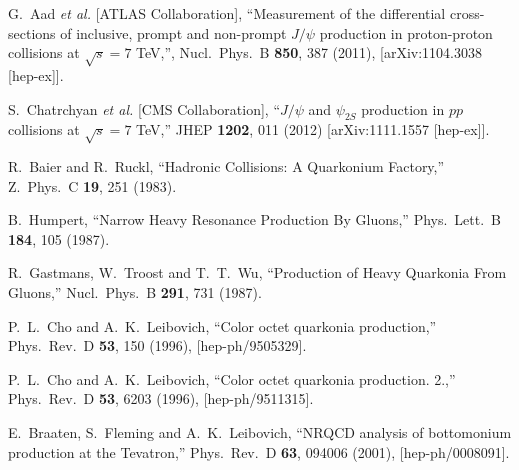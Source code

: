 \documentclass[aps,prc,preprint,superscriptaddress,showpacs,showkeys,amsmath]{revtex4-1}
\begin{document}
\begin{thebibliography}{100}
  G.~Aad {\it et al.} [ATLAS Collaboration],
  ``Measurement of the differential cross-sections of inclusive, prompt and non-prompt $J/\psi$ production in proton-proton 
  collisions at $\sqrt{s}=7$ TeV,'', 
  Nucl.\ Phys.\ B {\bf 850}, 387 (2011),  
  [arXiv:1104.3038 [hep-ex]].
  


  S.~Chatrchyan {\it et al.} [CMS Collaboration],
  ``$J/\psi$ and $\psi_{2S}$ production in $pp$ collisions at $\sqrt{s}=7$ TeV,''
  JHEP {\bf 1202}, 011 (2012)
  [arXiv:1111.1557 [hep-ex]].






%
  R.~Baier and R.~Ruckl,
  ``Hadronic Collisions: A Quarkonium Factory,''
  Z.\ Phys.\ C {\bf 19}, 251 (1983).


  B.~Humpert,
  ``Narrow Heavy Resonance Production By Gluons,''
  Phys.\ Lett.\ B {\bf 184}, 105 (1987).



  R.~Gastmans, W.~Troost and T.~T.~Wu,
  ``Production of Heavy Quarkonia From Gluons,''
  Nucl.\ Phys.\ B {\bf 291}, 731 (1987).



  P.~L.~Cho and A.~K.~Leibovich,
  ``Color octet quarkonia production,''
  Phys.\ Rev.\ D {\bf 53}, 150 (1996),
  [hep-ph/9505329].

  P.~L.~Cho and A.~K.~Leibovich,
  ``Color octet quarkonia production. 2.,''
  Phys.\ Rev.\ D {\bf 53}, 6203 (1996),
  [hep-ph/9511315].

  E.~Braaten, S.~Fleming and A.~K.~Leibovich,
  ``NRQCD analysis of bottomonium production at the Tevatron,''
  Phys.\ Rev.\ D {\bf 63}, 094006 (2001),
  [hep-ph/0008091].


\end{thebibliography}
\end{document}
